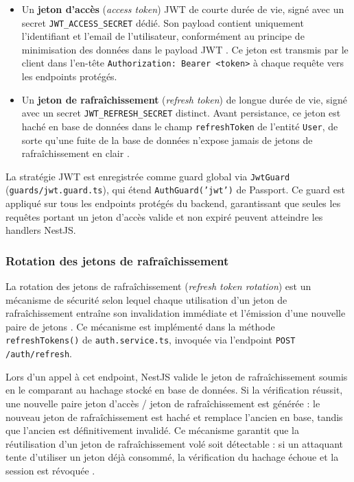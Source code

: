 \begin{itemize}
  \item Un \textbf{jeton d'accès} (\textit{access token}) JWT de courte durée de vie, signé avec un secret \texttt{JWT\_ACCESS\_SECRET} dédié. Son payload contient uniquement l'identifiant et l'email de l'utilisateur, conformément au principe de minimisation des données dans le payload JWT \cite{jwt-deepwiki}. Ce jeton est transmis par le client dans l'en-tête \texttt{Authorization: Bearer <token>} à chaque requête vers les endpoints protégés.
  \item Un \textbf{jeton de rafraîchissement} (\textit{refresh token}) de longue durée de vie, signé avec un secret \texttt{JWT\_REFRESH\_SECRET} distinct. Avant persistance, ce jeton est haché en base de données dans le champ \texttt{refreshToken} de l'entité \texttt{User}, de sorte qu'une fuite de la base de données n'expose jamais de jetons de rafraîchissement en clair \cite{refresh-token-nestjs}.
\end{itemize}

La stratégie JWT est enregistrée comme guard global via \texttt{JwtGuard} (\texttt{guards/jwt.guard.ts}), qui étend \texttt{AuthGuard('jwt')} de Passport. Ce guard est appliqué sur tous les endpoints protégés du backend, garantissant que seules les requêtes portant un jeton d'accès valide et non expiré peuvent atteindre les handlers NestJS.

\subsubsection*{Rotation des jetons de rafraîchissement}

La rotation des jetons de rafraîchissement (\textit{refresh token rotation}) est un mécanisme de sécurité selon lequel chaque utilisation d'un jeton de rafraîchissement entraîne son invalidation immédiate et l'émission d'une nouvelle paire de jetons \cite{refresh-token-rotation}. Ce mécanisme est implémenté dans la méthode \texttt{refreshTokens()} de \texttt{auth.service.ts}, invoquée via l'endpoint \texttt{POST /auth/refresh}.

Lors d'un appel à cet endpoint, NestJS valide le jeton de rafraîchissement soumis en le comparant au hachage stocké en base de données. Si la vérification réussit, une nouvelle paire jeton d'accès / jeton de rafraîchissement est générée : le nouveau jeton de rafraîchissement est haché et remplace l'ancien en base, tandis que l'ancien est définitivement invalidé. Ce mécanisme garantit que la réutilisation d'un jeton de rafraîchissement volé soit détectable : si un attaquant tente d'utiliser un jeton déjà consommé, la vérification du hachage échoue et la session est révoquée \cite{refresh-token-blog}.

